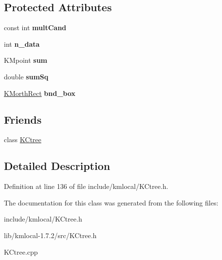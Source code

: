 \subsection*{Protected Attributes}
\begin{DoxyCompactItemize}
\item 
\hypertarget{class_k_cnode_a153f13b383c0b467949b5baf2e1bd40e}{
const int {\bfseries multCand}}
\label{class_k_cnode_a153f13b383c0b467949b5baf2e1bd40e}

\item 
\hypertarget{class_k_cnode_ad4f17f964268accb7b4252d6910fe420}{
int {\bfseries n\_\-data}}
\label{class_k_cnode_ad4f17f964268accb7b4252d6910fe420}

\item 
\hypertarget{class_k_cnode_a876d750f49265a1a7cfea5a73d22a2c6}{
KMpoint {\bfseries sum}}
\label{class_k_cnode_a876d750f49265a1a7cfea5a73d22a2c6}

\item 
\hypertarget{class_k_cnode_a125d59d14f3bf9bcf88921dec9938658}{
double {\bfseries sumSq}}
\label{class_k_cnode_a125d59d14f3bf9bcf88921dec9938658}

\item 
\hypertarget{class_k_cnode_a85abf790b1b281e6c3c57cde6f0cc99a}{
\hyperlink{class_k_morth_rect}{KMorthRect} {\bfseries bnd\_\-box}}
\label{class_k_cnode_a85abf790b1b281e6c3c57cde6f0cc99a}

\end{DoxyCompactItemize}
\subsection*{Friends}
\begin{DoxyCompactItemize}
\item 
\hypertarget{class_k_cnode_a5e976a2e5b950925995aac8330cc9eca}{
class \hyperlink{class_k_cnode_a5e976a2e5b950925995aac8330cc9eca}{KCtree}}
\label{class_k_cnode_a5e976a2e5b950925995aac8330cc9eca}

\end{DoxyCompactItemize}


\subsection{Detailed Description}


Definition at line 136 of file include/kmlocal/KCtree.h.



The documentation for this class was generated from the following files:\begin{DoxyCompactItemize}
\item 
include/kmlocal/KCtree.h\item 
lib/kmlocal-\/1.7.2/src/KCtree.h\item 
KCtree.cpp\end{DoxyCompactItemize}
